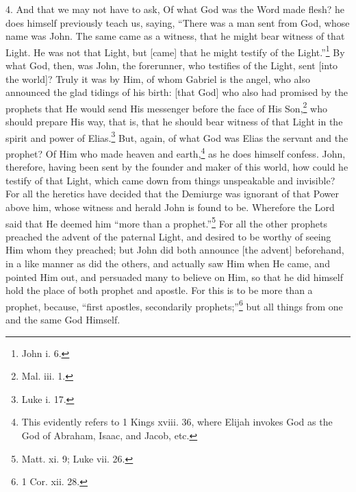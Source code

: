 4. And that we may not have to ask, Of what God was the Word made flesh? he does himself previously teach us, saying, “There was a man sent from God, whose name was John. The same came as a witness, that he might bear witness of that Light. He was not that Light, but [came] that he might testify of the Light.”\footnote{John i. 6.} By what God, then, was John, the forerunner, who testifies of the Light, sent [into the world]? Truly it was by Him, of whom Gabriel is the angel, who also announced the glad tidings of his birth: [that God] who also had promised by the prophets that He would send His messenger before the face of His Son,\footnote{Mal. iii. 1.} who should prepare His way, that is, that he should bear witness of that Light in the spirit and power of Elias.\footnote{Luke i. 17.} But, again, of what God was Elias the servant and the prophet? Of Him who made heaven and earth,\footnote{This evidently refers to 1 Kings xviii. 36, where Elijah invokes God as the God of Abraham, Isaac, and Jacob, etc.} as he does himself confess. John, therefore, having been sent by the founder and maker of this world, how could he testify of that Light, which came down from things unspeakable and invisible? For all the heretics have decided that the Demiurge was ignorant of that Power above him, whose witness and herald John is found to be. Wherefore the Lord said that He deemed him “more than a prophet.”\footnote{Matt. xi. 9; Luke vii. 26.} For all the other prophets preached the advent of the paternal Light, and desired to be worthy of seeing Him whom they preached; but John did both announce [the advent] beforehand, in a like manner as did the others, and actually saw Him when He came, and pointed Him out, and persuaded many to believe on Him, so that he did himself hold the place of both prophet and apostle. For this is to be more than a prophet, because, “first apostles, secondarily prophets;”\footnote{1 Cor. xii. 28.} but all things from one and the same God Himself.

